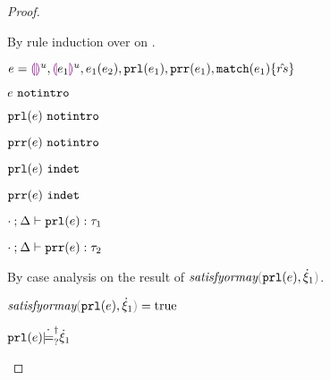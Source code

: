 \begin{proof}
\begin{byCases}
\begin{byCases}
    \item[\text{(\ref{rule:FIndet})}]
      \begin{pfsteps}
      \item {}  
      \end{pfsteps}
      By rule induction over  on .
      \begin{byCases}
        \item[\text{(\ref{rule:IEHole}), (\ref{rule:IHole}), (\ref{rule:IAp}), (\ref{rule:IPrl}), (\ref{rule:IPrr}), (\ref{rule:IMatch})}]
        \begin{pfsteps*}
        \item $e=\textcolor{violet}{\llparenthesis}\textcolor{violet}{\rrparenthesis}^{u}, \textcolor{violet}{\llparenthesis} e_1\textcolor{violet}{\rrparenthesis}^{u}, e_1(e_2), \mathtt{prl}(e_1), \mathtt{prr}(e_1), \mathtt{match}(e_1) \{\hat{rs}\}$ 
        \item $e ~\mathtt{notintro}$  
        \item $\mathtt{prl}(e) ~\mathtt{notintro}$  
        \item $\mathtt{prr}(e) ~\mathtt{notintro}$  
        \item $\mathtt{prl}(e) ~\mathtt{indet}$  
        \item $\mathtt{prr}(e) ~\mathtt{indet}$  
        \item $\cdot \mathbin{;} \Delta \vdash \mathtt{prl}(e) : \tau_1$  
        \item $\cdot \mathbin{;} \Delta \vdash \mathtt{prr}(e) : \tau_2$  
        \end{pfsteps*}
        By case analysis on the result of $\fsatisfyormay{\hprl{e}}{\hxi_1}$.
        \begin{byCases}
          \item[\true]
          \begin{pfsteps*}
          \item $\fsatisfyormay{\hprl{e}}{\hxi_1}=\true$  
          \item $\mathtt{prl}(e) \dot{\models}_{?}^{\dag} \dot{\xi}_1$  
          \end{pfsteps*} 

\end{byCases}
\end{byCases}
\end{byCases}
\end{byCases}
\end{proof}

